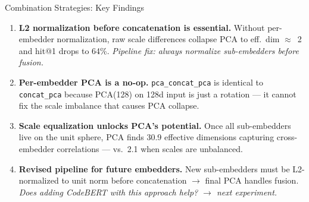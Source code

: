 \documentclass[aspectratio=169,10pt]{beamer}
\begin{document}
\begin{frame}{Combination Strategies: Key Findings}

  \begin{enumerate}\setlength{\itemsep}{0.5em}

    \item[\textcolor{hit}{\faIcon{check-circle}}]
      \textbf{L2 normalization before concatenation is essential.}
      Without per-embedder normalization, raw scale differences
      collapse PCA to eff.\ dim $\approx$~2 and hit@1 drops to 64\%.
      \textit{Pipeline fix: always normalize sub-embedders before fusion.}

    \vspace{0.5em}
    \item[\textcolor{miss}{\faIcon{compress-arrows-alt}}]
      \textbf{Per-embedder PCA is a no-op.}
      \texttt{pca\_concat\_pca} is identical to \texttt{concat\_pca} because
      PCA(128) on 128d input is just a rotation --- it cannot fix
      the scale imbalance that causes PCA collapse.

    \vspace{0.5em}
    \item[\textcolor{c1}{\faIcon{chart-bar}}]
      \textbf{Scale equalization unlocks PCA's potential.}
      Once all sub-embedders live on the unit sphere,
      PCA finds 30.9 effective dimensions capturing cross-embedder
      correlations --- vs.\ 2.1 when scales are unbalanced.

    \vspace{0.5em}
    \item[\textcolor{c3}{\faIcon{lightbulb}}]
      \textbf{Revised pipeline for future embedders.}
      New sub-embedders must be L2-normalized to unit norm
      before concatenation $\to$ final PCA handles fusion.
      \textit{Does adding CodeBERT with this approach help? $\to$ next experiment.}

  \end{enumerate}
\end{frame}
\end{document}
